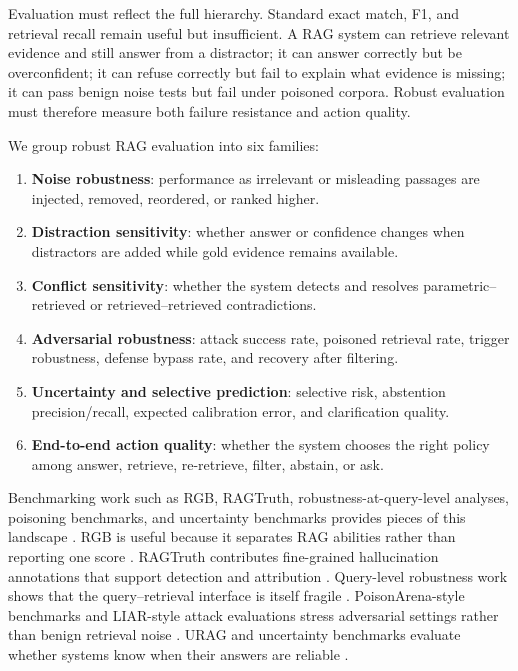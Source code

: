 
\label{sec:evaluation}








Evaluation must reflect the full hierarchy. Standard exact match, F1, and retrieval recall remain useful but insufficient. A RAG system can retrieve relevant evidence and still answer from a distractor; it can answer correctly but be overconfident; it can refuse correctly but fail to explain what evidence is missing; it can pass benign noise tests but fail under poisoned corpora. Robust evaluation must therefore measure both failure resistance and action quality.

We group robust RAG evaluation into six families:
\begin{enumerate}[leftmargin=*]
    \item \textbf{Noise robustness}: performance as irrelevant or misleading passages are injected, removed, reordered, or ranked higher.
    \item \textbf{Distraction sensitivity}: whether answer or confidence changes when distractors are added while gold evidence remains available.
    \item \textbf{Conflict sensitivity}: whether the system detects and resolves parametric--retrieved or retrieved--retrieved contradictions.
    \item \textbf{Adversarial robustness}: attack success rate, poisoned retrieval rate, trigger robustness, defense bypass rate, and recovery after filtering.
    \item \textbf{Uncertainty and selective prediction}: selective risk, abstention precision/recall, expected calibration error, and clarification quality.
    \item \textbf{End-to-end action quality}: whether the system chooses the right policy among answer, retrieve, re-retrieve, filter, abstain, or ask.
\end{enumerate}
Benchmarking work such as RGB, RAGTruth, robustness-at-query-level analyses, poisoning benchmarks, and uncertainty benchmarks provides pieces of this landscape \citep{rgb2023,ragTruth2024,queryRobustness2025}. RGB is useful because it separates RAG abilities rather than reporting one score \citep{rgb2023}. RAGTruth contributes fine-grained hallucination annotations that support detection and attribution \citep{ragTruth2024}. Query-level robustness work shows that the query--retrieval interface is itself fragile \citep{queryRobustness2025}. PoisonArena-style benchmarks and LIAR-style attack evaluations stress adversarial settings rather than benign retrieval noise \citep{rrag023,rrag035}. URAG and uncertainty benchmarks evaluate whether systems know when their answers are reliable \citep{rrag001,rrag093}.

